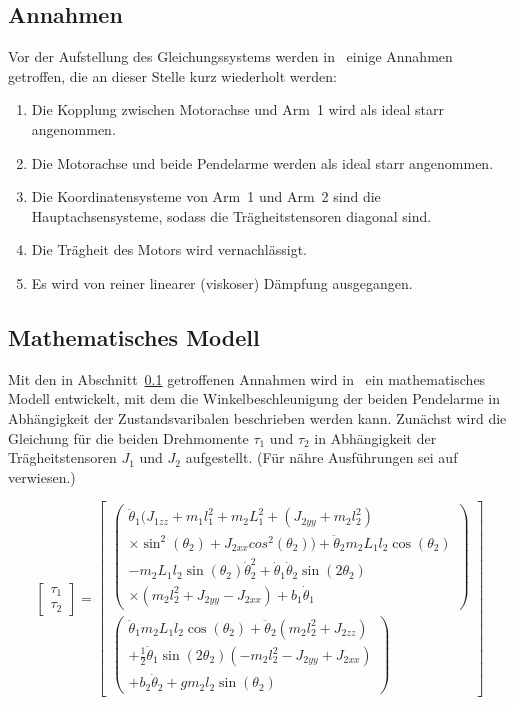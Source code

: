 \subsection{Annahmen}
\label{sub.sub.Annahmen}
Vor der Aufstellung des Gleichungssystems werden in~\cite{Cazzolato.2011} einige Annahmen getroffen, die an dieser Stelle kurz wiederholt werden:
\begin{enumerate}
\item Die Kopplung zwischen Motorachse und Arm~1 wird als ideal starr angenommen.
\item Die Motorachse und beide Pendelarme werden als ideal starr angenommen.
\item Die Koordinatensysteme von Arm~1 und Arm~2 sind die Hauptachsensysteme, sodass die Trägheitstensoren diagonal sind.
\item Die Trägheit des Motors wird vernachlässigt. %
\item Es wird von reiner linearer (viskoser) Dämpfung ausgegangen.
\end{enumerate}

\subsection{Mathematisches Modell}
\label{sub.sub.Mathematisches-Modell}
Mit den in Abschnitt~\ref{sub.sub.Annahmen} getroffenen Annahmen wird in~\cite{Cazzolato.2011} ein mathematisches Modell entwickelt, mit dem die Winkelbeschleunigung der beiden Pendelarme in Abhängigkeit der Zustands\-varibalen beschrieben werden kann. 
Zunächst wird die Gleichung für die beiden Drehmomente $\tau_1$ und $\tau_2$ in Abhängigkeit der Trägheitstensoren $J_1$ und $J_2$ aufgestellt.
(Für nähre Ausführungen sei auf~\cite{Cazzolato.2011} verwiesen.)

\begin{equation}
\label{eqn.TauComplex}
\begin{bmatrix}
\tau_1 \\
\tau_2
\end{bmatrix}
=
\begin{bmatrix}
\begin{pmatrix}
\ddot{\theta}_1(J_{1zz}+m_1l^2_1+m_2L^2_1+(J_{2yy}+m_2l^2_2) 						\\
\times \sin^2(\theta_2)+J_{2xx}cos^2(\theta_2))+\ddot{\theta}_2m_2L_1l_2\cos(\theta_2)			\\
-m_2L_1l_2\sin(\theta_2)\dot{\theta}^2_2+\dot{\theta}_1\dot{\theta}_2\sin(2\theta_2)	\\
\times(m_2l^2_2+J_{2yy}-J_{2xx})+b_1\dot{\theta}_1
\end{pmatrix}
\\
\begin{pmatrix}
\ddot{\theta}_1m_2L_1l_2\cos(\theta_2)+\ddot{\theta}_2(m_2l^2_2+J_{2zz})	\\
+\frac{1}{2}\dot{\theta}_1\sin(2\theta_2)(-m_2l^2_2-J_{2yy}+J_{2xx})						\\
+b_2\dot{\theta}_2+gm_2l_2\sin(\theta_2)
\end{pmatrix}
\end{bmatrix}
\end{equation}

